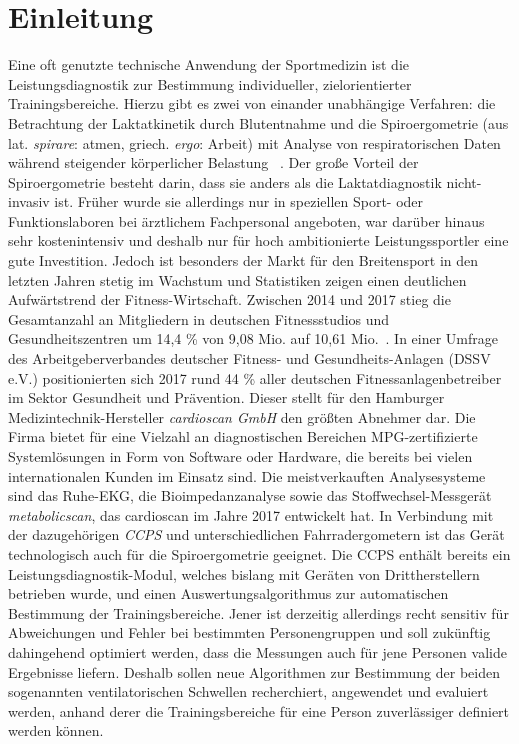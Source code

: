 \chapter{Einleitung}
%
Eine oft genutzte technische Anwendung der Sportmedizin ist die Leistungsdiagnostik zur Bestimmung individueller, zielorientierter Trainingsbereiche. Hierzu gibt es zwei von einander unabhängige Verfahren: die Betrachtung der Laktatkinetik durch Blutentnahme und die Spiroergometrie (aus lat. \textsl{spirare}: atmen, griech. \textsl{ergo}: Arbeit) mit Analyse von respiratorischen Daten während steigender körperlicher Belastung~\cite{Westhoff.2012} . Der große Vorteil der Spiroergometrie besteht darin, dass sie anders als die Laktatdiagnostik nicht-invasiv ist. Früher wurde sie allerdings nur in speziellen Sport- oder Funktionslaboren bei ärztlichem Fachpersonal angeboten, war darüber hinaus sehr kostenintensiv und deshalb nur für hoch ambitionierte Leistungssportler eine gute Investition. Jedoch ist besonders der Markt für den Breitensport in den letzten Jahren stetig im Wachstum und Statistiken zeigen einen deutlichen Aufwärtstrend der Fitness-Wirtschaft. Zwischen 2014 und 2017 stieg die Gesamtanzahl an Mitgliedern in deutschen Fitnessstudios und Gesundheitszentren um 14,4 \% von 9,08 Mio. auf 10,61 Mio.~\cite{DSSV.2018}. In einer Umfrage des Arbeitgeberverbandes deutscher Fitness- und Gesundheits-Anlagen (DSSV e.V.) positionierten sich 2017 rund 44 \% aller deutschen Fitnessanlagenbetreiber im Sektor Gesundheit und Prävention. Dieser stellt für den Hamburger Medizintechnik-Hersteller \textsl{cardioscan GmbH} den größten Abnehmer dar. Die Firma bietet für eine Vielzahl an diagnostischen Bereichen MPG-zertifizierte Systemlösungen in Form von Software oder Hardware, die bereits bei vielen internationalen Kunden im Einsatz sind. Die meistverkauften Analysesysteme sind das Ruhe-EKG, die Bioimpedanzanalyse sowie das Stoffwechsel-Messgerät \textsl{metabolicscan}, das cardioscan im Jahre 2017 entwickelt hat. In Verbindung mit der dazugehörigen \textsl{\gls{CCPS}} und unterschiedlichen Fahrradergometern ist das Gerät technologisch auch für die Spiroergometrie geeignet. Die \gls{CCPS} enthält bereits ein Leistungsdiagnostik-Modul, welches bislang mit Geräten von Drittherstellern betrieben wurde, und einen Auswertungsalgorithmus zur automatischen Bestimmung der Trainingsbereiche. Jener ist derzeitig allerdings recht sensitiv für Abweichungen und Fehler bei bestimmten Personengruppen und soll zukünftig dahingehend optimiert werden, dass die Messungen auch für jene Personen valide Ergebnisse liefern. Deshalb sollen neue Algorithmen zur Bestimmung der beiden sogenannten ventilatorischen Schwellen recherchiert, angewendet und evaluiert werden, anhand derer die Trainingsbereiche für eine Person zuverlässiger definiert werden können.
%
